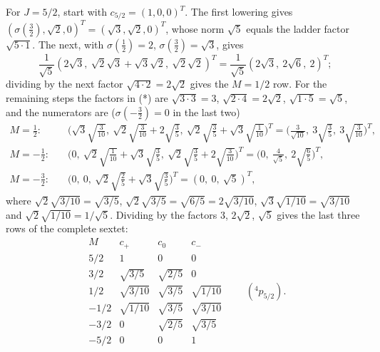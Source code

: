 For $J=5/2$, start with $c_{5/2}=(1,0,0)^T$.
The first lowering gives $(\sigma(\tfrac32),\sqrt2,0)^T
=(\sqrt3,\sqrt2,0)^T$, whose norm $\sqrt5$ equals the ladder factor
$\sqrt{5\cdot1}$. The next, with $\sigma(\tfrac12)=2$,
$\sigma(\tfrac32)=\sqrt3$, gives
\[
\frac1{\sqrt5}(2\sqrt3,\ \sqrt2\sqrt3+\sqrt3\sqrt2,\ \sqrt2\sqrt2)^T
=\frac1{\sqrt5}(2\sqrt3,\ 2\sqrt6,\ 2)^T;
\]
dividing by the next factor $\sqrt{4\cdot2}=2\sqrt2$ gives the
$M=1/2$ row.
For the remaining steps the factors in (*) are
$\sqrt{3\cdot3}=3$, $\sqrt{2\cdot4}=2\sqrt2$, $\sqrt{1\cdot5}=\sqrt5$,
and the numerators are ($\sigma(-\tfrac32)=0$ in the last two)
\[
\begin{aligned}
M=\tfrac12:&\quad
\bigl(\sqrt3\sqrt{\tfrac3{10}},\
\sqrt2\sqrt{\tfrac3{10}}+2\sqrt{\tfrac35},\
\sqrt2\sqrt{\tfrac35}+\sqrt3\sqrt{\tfrac1{10}}\bigr)^T
=\bigl(\tfrac3{\sqrt{10}},\ 3\sqrt{\tfrac35},\
3\sqrt{\tfrac3{10}}\bigr)^T,\\
M=-\tfrac12:&\quad
\bigl(0,\ \sqrt2\sqrt{\tfrac1{10}}+\sqrt3\sqrt{\tfrac35},\
\sqrt2\sqrt{\tfrac35}+2\sqrt{\tfrac3{10}}\bigr)^T
=\bigl(0,\ \tfrac4{\sqrt5},\ 2\sqrt{\tfrac65}\bigr)^T,\\
M=-\tfrac32:&\quad
\bigl(0,\ 0,\ \sqrt2\sqrt{\tfrac25}+\sqrt3\sqrt{\tfrac35}\bigr)^T
=(0,\ 0,\ \sqrt5)^T,
\end{aligned}
\]
where $\sqrt2\sqrt{3/10}=\sqrt{3/5}$,
$\sqrt2\sqrt{3/5}=\sqrt{6/5}=2\sqrt{3/10}$,
$\sqrt3\sqrt{1/10}=\sqrt{3/10}$ and $\sqrt2\sqrt{1/10}=1/\sqrt5$.
Dividing by the factors $3$, $2\sqrt2$, $\sqrt5$ gives the last three
rows of the complete sextet:
\[
\boxed{\begin{array}{c|ccc}
M&c_+&c_0&c_-\\ \hline
5/2&1&0&0\\
3/2&\sqrt{3/5}&\sqrt{2/5}&0\\
1/2&\sqrt{3/10}&\sqrt{3/5}&\sqrt{1/10}\\
-1/2&\sqrt{1/10}&\sqrt{3/5}&\sqrt{3/10}\\
-3/2&0&\sqrt{2/5}&\sqrt{3/5}\\
-5/2&0&0&1
\end{array}}\qquad ({}^4p_{5/2}).
\]

